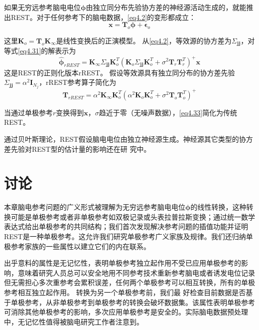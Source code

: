 如果无穷远参考脑电电位$\mathbf{\phi}$由独立同分布先验协方差的神经源活动生成的，就能推出REST。对于任何参考下的脑电数据，\eqref{eq4.2}的变形都成立：
\begin{equation}\label{eq4.31}
\mathbf{x}=\mathbf{T}_o\mathbf{\phi}+\mathbf{\epsilon}_o
\end{equation}


这里$\mathbf{K}_o=\mathbf{T}_o\mathbf{K}_{\infty}$是线性变换后的正演模型。 从\eqref{eq4.2}，等效源的协方差为$\Sigma_{\mathbf{jj}}$，对等式\eqref{eq4.31}的解表示为
\begin{equation}\label{eq4.32}
\hat{\mathbf{\phi}}_{rREST}=\mathbf{K}_{\infty}\Sigma_{\mathbf{jj}}\mathbf{K}_o^T(\mathbf{K}_o\Sigma_{\mathbf{jj}}\mathbf{K}_o^T+\sigma^2\mathbf{T}_r\mathbf{T}_r^T)^+\mathbf{x}
\end{equation}
这是REST的正则化版本rREST。 假设等效源具有独立同分布的协方差先验$\Sigma_\mathbf{jj}=\alpha^2\mathbf{I}_{N_j}$，rREST参考算子简化为
\begin{equation}\label{eq4.33}
\mathbf{T}_{rREST}=\alpha^2\mathbf{K}_{\infty}\mathbf{K}_o^T(\alpha^2\mathbf{K}_o\mathbf{K}_o^T+\sigma^2\mathbf{T}_o\mathbf{T}_o^T)^+
\end{equation}

当通过单极参考$r$变换得到$\mathbf{x}$，$\sigma$趋近于零（无噪声数据），\eqref{eq4.33}简化为传统REST。

通过贝叶斯理论，REST假设脑电电位由独立神经源生成。神经源其它类型的协方差先验对REST型的估计量的影响还在研
究中。 
\section{讨论}
本章脑电参考问题的广义形式被理解为无穷远参考脑电电位$\mathbf{\phi}$的线性转换，这种转换可能是单极参考或者非单极参考如双极记录或头表拉普拉斯变换；通过统一数学表达式给出单极参考的共同结构；我们首次发现解决参考问题的插值功能并证明REST是一种单极参考。这允许我们研究单极参考广义家族及规律。我们还归纳单极参考家族的一些属性以建立它们的内在联系。 

出乎意料的属性是无记忆性，表明单极参考独立起作用不受已应用单极参考的影响，意味着研究人员总可以安全地用不同参考技术重新参考脑电或者诱发电位记录但无需担心多次重参考会累积误差，任何两个单极参考可以相互转换，所有的单极参考相互独立起作用。 转换为另一个单极参考前，我们最
好检查目前数据是否基于单极参考，从非单极参考到单极参考的转换会破坏数据集。该属性表明单极参考可消除其他单极参考的影响，多次应用单极参考是安全的。实际脑电数据预处理中，无记忆性值得被脑电研究工作者注意到。

